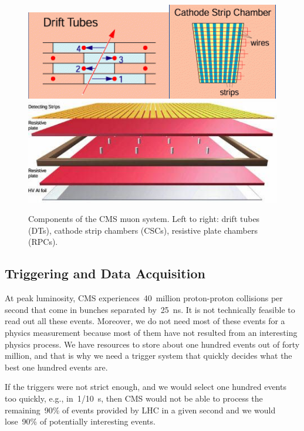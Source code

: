 \begin{figure}[htb]
  \begin{center}
    \includegraphics[height=2.5 cm]{../figs/Exp/muonSystem_driftTubes.png}\quad\includegraphics[height=2.5 cm]{../figs/Exp/muonSystem_CSC.png}\quad\includegraphics[height=2.5 cm]{../figs/Exp/muonSystem_RPC.png}
    \caption{Components of the CMS muon system. Left to right: drift tubes (DTs), cathode strip chambers (CSCs), resistive plate chambers (RPCs).}
    \label{fig:muonSystem}
  \end{center}
\end{figure}


\subsection{Triggering and Data Acquisition}

At peak luminosity, CMS experiences~40~million proton-proton collisions per second that come in bunches separated by~25~ns. It is not technically feasible to read out all these events. Moreover, we do not need most of these events for a physics measurement because most of them have not resulted from an interesting physics process. We have resources to store about one hundred events out of forty million, and that is why we need a trigger system that quickly decides what the best one hundred events are.


If the triggers were not strict enough, and we would select one hundred events too quickly, e.g., in~1/10~s, then CMS would not be able to process the remaining~90\% of events provided by LHC in a given second and we would lose~90\% of potentially interesting events.

